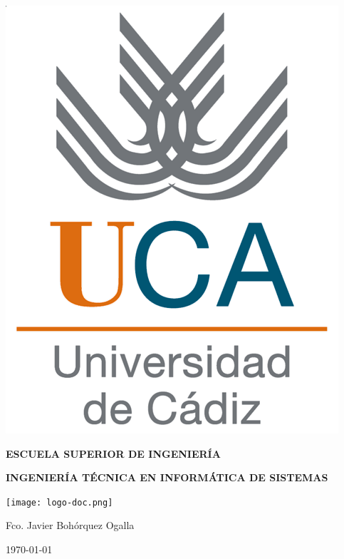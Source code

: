 


\begin{titlepage}

  \begin{center}

    \includegraphics[width=0.3 \textwidth]{logo.png} \\
    
    \vspace{2.5cm}
    
    \LARGE{\textbf{ESCUELA SUPERIOR DE INGENIERÍA}} \\
    
    \vspace{1.0cm}
    
    \Large{\textbf{INGENIERÍA TÉCNICA EN INFORMÁTICA DE SISTEMAS}} \\
    
    \vspace{3.0cm}
    
      \begin{center}
   \texttt{[image: logo-doc.png]}
   \end{center} 
    
    \vspace{2.5cm}
    
    \Large{Fco. Javier Bohórquez Ogalla} \\
  
    \vspace{0.5cm}

    \large{\today}
    
  \end{center}
\end{titlepage}

